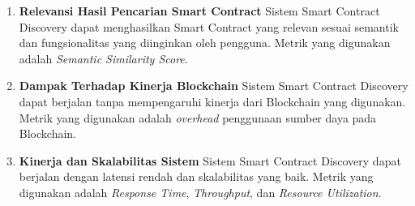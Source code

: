 \begin{enumerate}
  \item \textbf{Relevansi Hasil Pencarian Smart Contract} \newline 
  Sistem Smart Contract Discovery dapat menghasilkan Smart Contract yang relevan sesuai semantik dan fungsionalitas yang diinginkan oleh pengguna. Metrik yang digunakan adalah \textit{Semantic Similarity Score}. 
  
  \item \textbf{Dampak Terhadap Kinerja Blockchain} \newline 
  Sistem Smart Contract Discovery dapat berjalan tanpa mempengaruhi kinerja dari Blockchain yang digunakan. Metrik yang digunakan adalah \textit{overhead} penggunaan sumber daya pada Blockchain.
  \item \textbf{Kinerja dan Skalabilitas Sistem} \newline 
  Sistem Smart Contract Discovery dapat berjalan dengan latensi rendah dan skalabilitas yang baik. Metrik yang digunakan adalah \textit{Response Time}, \textit{Throughput}, dan \textit{Resource Utilization}.
\end{enumerate}